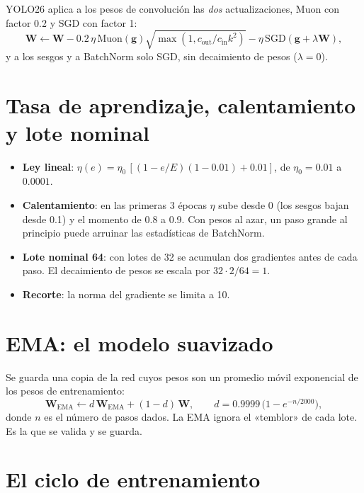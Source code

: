 YOLO26 aplica a los pesos de convolución las \emph{dos} actualizaciones, Muon con
factor 0.2 y SGD con factor 1:
\begin{equation}
\mathbf{W} \leftarrow \mathbf{W} - 0.2\,\eta\,\mathrm{Muon}(\mathbf{g})
\sqrt{\max(1, c_{\text{out}}/c_{\text{in}}k^2)}
- \eta\,\mathrm{SGD}(\mathbf{g} + \lambda\mathbf{W}),
\end{equation}
y a los sesgos y a BatchNorm solo SGD, sin decaimiento de pesos ($\lambda = 0$).

\section{Tasa de aprendizaje, calentamiento y lote nominal}

\begin{itemize}
  \item \textbf{Ley lineal}: $\eta(e) = \eta_0\,[(1 - e/E)(1 - 0.01) + 0.01]$, de
        $\eta_0 = 0.01$ a $0.0001$.
  \item \textbf{Calentamiento}: en las primeras 3 épocas $\eta$ sube desde 0 (los
        sesgos bajan desde 0.1) y el momento de 0.8 a 0.9. Con pesos al azar, un paso
        grande al principio puede arruinar las estadísticas de BatchNorm.
  \item \textbf{Lote nominal 64}: con lotes de 32 se acumulan dos gradientes antes de
        cada paso. El decaimiento de pesos se escala por $32\cdot2/64 = 1$.
  \item \textbf{Recorte}: la norma del gradiente se limita a 10.
\end{itemize}

\section{EMA: el modelo suavizado}

Se guarda una copia de la red cuyos pesos son un promedio móvil exponencial de
los pesos de entrenamiento:
\begin{equation}
\mathbf{W}_{\text{EMA}} \leftarrow d\,\mathbf{W}_{\text{EMA}} + (1-d)\,\mathbf{W},\qquad
d = 0.9999\,\big(1 - e^{-n/2000}\big),
\end{equation}
donde $n$ es el número de pasos dados. La EMA ignora el «temblor» de cada lote. Es
la que se valida y se guarda.

\section{El ciclo de entrenamiento}

